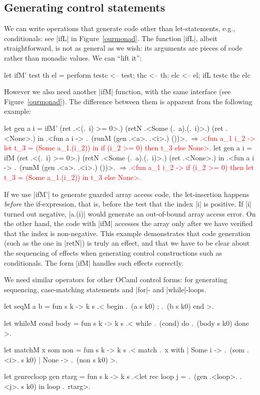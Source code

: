 \documentclass{elsart}
\newcommand{\evalresult}[1]{\ensuremath{\Longrightarrow}\textcolor{red}{#1}}
\begin{document}
\subsection{Generating control statements}\label{ssec:control}
We can write operations that generate code other than let-statements,
e.g., conditionals: see |ifL| in Figure~\ref{ourmonad}. The function |ifL|, 
albeit straightforward, is not as general as we wish: its arguments are
pieces of code rather than monadic values. We can ``lift it'':
\begin{code}
let ifM' test th el = perform
  testc <-- test; thc <-- th; elc <-- el;
  ifL testc thc elc
\end{code}
However we also need another |ifM| function, with the same
interface (see Figure~\ref{ourmonad}).
The difference between them is apparent from the following example:
\begin{code}[commandchars=\\\{\}]
let gen a i = ifM' (ret .<(.~i) >= 0>.) 
                   (retN .<Some (.~a).(.~i)>.) (ret .<None>.)
 in .<fun a i -> .~(runM (gen .<a>. .<i>.) ())>.
\evalresult{.<fun a_1 i_2 ->}
\textcolor{red}{      let t_3 = (Some a_1.(i_2)) in if (i_2 >= 0) then t_3 else None>.}
let gen a i = ifM (ret .<(.~i) >= 0>.) 
                  (retN .<Some (.~a).(.~i)>.) (ret .<None>.)
 in .<fun a i -> .~(runM (gen .<a>. .<i>.) ())>.
\evalresult{.<fun a_1 i_2 ->}
\textcolor{red}{      if (i_2 >= 0) then let t_3 = (Some a_1.(i_2)) in t_3 else None>.}
\end{code}
%
If we use |ifM'| to generate guarded array access code, the let-insertion
happens \emph{before} the if-expression, that is, before the test that
the index |i| is positive. If |i| turned out
negative, |a.(i)| would generate an out-of-bound array access
error. On the other hand, the code with |ifM| accesses the array only
after we have verified that the index is non-negative. This example
demonstrates that code generation (such as the one in |retN|) is 
truly an effect, and that we have to be clear about the sequencing of
effects when generating control constructions such as conditionals.
The form |ifM| handles such effects correctly. 

We need similar operators for other OCaml control forms: for
generating sequencing, case-matching statements and |for|- and |while|-loops.
\begin{code}
let seqM a b = fun s k -> 
  k s .< begin .~(a s k0) ; .~(b s k0) end >.

let whileM cond body = fun s k -> 
  k s .< while .~(cond) do .~(body s k0) done >.

let matchM x som non = fun s k -> k s .< match .~x with
           | Some i -> .~(som .<i>. s k0)
           | None   -> .~(non s k0) >.

let genrecloop gen rtarg = fun s k -> 
  k s .<let rec loop j = .~(gen .<loop>. .<j>. s k0) in loop .~rtarg>.
\end{code}
\end{document}
